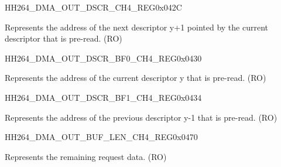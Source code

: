 \begin{register}{H}{H264\_DMA\_OUT\_DSCR\_CH4\_REG}{0x042C}\label{regdesc:H264DMAOUTDSCRCH4REG}
%
\regnewline%
\begin{regdesc}\begin{reglist}
\label{fielddesc:H264DMAOUTLINKDSCRCH4}\item [H264\_DMA\_OUTLINK\_DSCR\_CH4] Represents the address of the next descriptor y+1 pointed by the current descriptor that is pre-read. (RO)
\end{reglist}\end{regdesc}
\end{register}


\begin{register}{H}{H264\_DMA\_OUT\_DSCR\_BF0\_CH4\_REG}{0x0430}\label{regdesc:H264DMAOUTDSCRBF0CH4REG}
%
\regnewline%
\begin{regdesc}\begin{reglist}
\label{fielddesc:H264DMAOUTLINKDSCRBF0CH4}\item [H264\_DMA\_OUTLINK\_DSCR\_BF0\_CH4] Represents the address of the current descriptor y that is pre-read. (RO)
\end{reglist}\end{regdesc}
\end{register}


\begin{register}{H}{H264\_DMA\_OUT\_DSCR\_BF1\_CH4\_REG}{0x0434}\label{regdesc:H264DMAOUTDSCRBF1CH4REG}
%
\regnewline%
\begin{regdesc}\begin{reglist}
\label{fielddesc:H264DMAOUTLINKDSCRBF1CH4}\item [H264\_DMA\_OUTLINK\_DSCR\_BF1\_CH4] Represents the address of the previous descriptor y-1 that is pre-read. (RO)
\end{reglist}\end{regdesc}
\end{register}

\begin{register}{H}{H264\_DMA\_OUT\_BUF\_LEN\_CH4\_REG}{0x0470}\label{regdesc:H264DMAOUTBUFLENCH4REG}
%
%
\regnewline%
\begin{regdesc}\begin{reglist}
\label{fielddesc:H264DMAOUTCMDFIFOBUFLENHBCH4}\item [H264\_DMA\_OUT\_CMDFIFO\_BUF\_LEN\_HB\_CH4] Represents the remaining request data. (RO)
\end{reglist}\end{regdesc}
\end{register}


